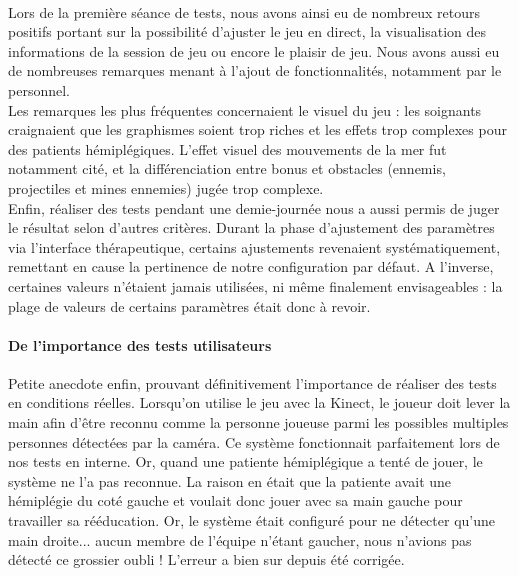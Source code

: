 \paragraph{} 
Lors de la première séance de tests, nous avons ainsi eu de nombreux retours positifs portant sur la possibilité d'ajuster le jeu en direct, la visualisation des informations de la session de jeu ou encore le plaisir de jeu. Nous avons aussi eu de nombreuses remarques menant à l'ajout de fonctionnalités, notamment par le personnel.\\
Les remarques les plus fréquentes concernaient le visuel du jeu : les soignants craignaient que les graphismes soient trop riches et les effets trop complexes pour des patients hémiplégiques. L'effet visuel des mouvements de la mer fut notamment cité, et la différenciation entre bonus et obstacles (ennemis, projectiles et mines ennemies) jugée trop complexe.\\
Enfin, réaliser des tests pendant une demie-journée nous a aussi permis de juger le résultat selon d'autres critères. Durant la phase d'ajustement des paramètres via l'interface thérapeutique, certains ajustements revenaient systématiquement, remettant en cause la pertinence de notre configuration par défaut. A l'inverse, certaines valeurs n'étaient jamais utilisées, ni même finalement envisageables : la plage de valeurs de certains paramètres était donc à revoir.

\paragraph{De l'importance des tests utilisateurs\\}Petite anecdote enfin, prouvant définitivement l'importance de réaliser des tests en conditions réelles. Lorsqu'on utilise le jeu avec la Kinect, le joueur doit lever la main afin d'être reconnu comme la personne joueuse parmi les possibles multiples personnes détectées par la caméra. Ce système fonctionnait parfaitement lors de nos tests en interne. Or, quand une patiente hémiplégique a tenté de jouer, le système ne l'a pas reconnue. La raison en était que la patiente avait une hémiplégie du coté gauche et voulait donc jouer avec sa main gauche pour travailler sa rééducation. Or, le système était configuré pour ne détecter qu'une main droite... aucun membre de l'équipe n'étant gaucher, nous n'avions pas détecté ce grossier oubli ! L'erreur a bien sur depuis été corrigée.

